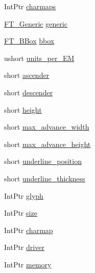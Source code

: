 \begin{DoxyCompactItemize}
\item 
IntPtr \hyperlink{struct_tao_1_1_free_type_1_1_f_t___face_rec_a28d520829e10b34a82d098dc727b5b7c}{charmaps}
\item 
\hyperlink{struct_tao_1_1_free_type_1_1_f_t___generic}{FT\_\-Generic} \hyperlink{struct_tao_1_1_free_type_1_1_f_t___face_rec_a66f75aa592a6d01b190291ccb0cc3de3}{generic}
\item 
\hyperlink{struct_tao_1_1_free_type_1_1_f_t___b_box}{FT\_\-BBox} \hyperlink{struct_tao_1_1_free_type_1_1_f_t___face_rec_afbc704b30c153cb2c1ecf05973216bd7}{bbox}
\item 
ushort \hyperlink{struct_tao_1_1_free_type_1_1_f_t___face_rec_a641631e81c6b6db9e6f625d56249765b}{units\_\-per\_\-EM}
\item 
short \hyperlink{struct_tao_1_1_free_type_1_1_f_t___face_rec_a16479aa5af0baec58671a9256a3e119c}{ascender}
\item 
short \hyperlink{struct_tao_1_1_free_type_1_1_f_t___face_rec_a13eba82dffdd16527a8ec5e276cafd8a}{descender}
\item 
short \hyperlink{struct_tao_1_1_free_type_1_1_f_t___face_rec_ad58f5c3910b04cca51f9162213943cbb}{height}
\item 
short \hyperlink{struct_tao_1_1_free_type_1_1_f_t___face_rec_a9bef2e6d69b0c830f8c30346f6a62428}{max\_\-advance\_\-width}
\item 
short \hyperlink{struct_tao_1_1_free_type_1_1_f_t___face_rec_ae149db5b5939f65bfcc5e2edbbb2111a}{max\_\-advance\_\-height}
\item 
short \hyperlink{struct_tao_1_1_free_type_1_1_f_t___face_rec_a8d21f666484ad093a6a682a5b4d8610f}{underline\_\-position}
\item 
short \hyperlink{struct_tao_1_1_free_type_1_1_f_t___face_rec_aad5b5431d1523ad602e4c7f01b179aee}{underline\_\-thickness}
\item 
IntPtr \hyperlink{struct_tao_1_1_free_type_1_1_f_t___face_rec_a00036b7cc96db5660affa36c1d539be1}{glyph}
\item 
IntPtr \hyperlink{struct_tao_1_1_free_type_1_1_f_t___face_rec_ae3b36e176cfaa41386fefa9cec6687f2}{size}
\item 
IntPtr \hyperlink{struct_tao_1_1_free_type_1_1_f_t___face_rec_a4170297641ced44cd8247d7bdfe0c6af}{charmap}
\item 
IntPtr \hyperlink{struct_tao_1_1_free_type_1_1_f_t___face_rec_af7df917f01e4987defa88aaccdab1a85}{driver}
\item 
IntPtr \hyperlink{struct_tao_1_1_free_type_1_1_f_t___face_rec_ab7f0009fb8f666254ab4ec220c9c8952}{memory}

\end{DoxyCompactItemize}
